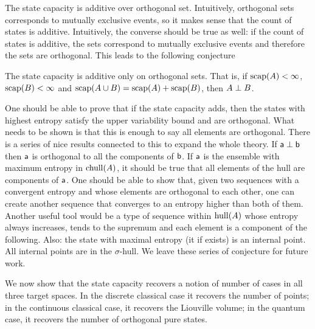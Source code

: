The state capacity is additive over orthogonal set. Intuitively, orthogonal sets corresponds to mutually exclusive events, so it makes sense that the count of states is additive. Intuitively, the converse should be true as well: if the count of states is additive, the sets correspond to mutually exclusive events and therefore the sets are orthogonal. This leads to the following conjecture

\begin{conj}
	The state capacity is additive only on orthogonal sets. That is, if $\scap(A)<\infty$, $\scap(B)<\infty$ and $\scap(A \cup B) = \scap(A) +\scap(B)$, then $A \ortho B$.
\end{conj}

One should be able to prove that if the state capacity adds, then the states with highest entropy satisfy the upper variability bound and are orthogonal. What needs to be shown is that this is enough to say all elements are orthogonal. There is a series of nice results connected to this to expand the whole theory. If $\ens[a] \ortho \ens[b]$ then $\ens[a]$ is orthogonal to all the components of $\ens[b]$. If $\ens[a]$ is the ensemble with maximum entropy in $\chull(A)$, it should be true that all elements of the hull are components of $\ens[a]$. One should be able to show that, given two sequences with a convergent entropy and whose elements are orthogonal to each other, one can create another sequence that converges to an entropy higher than both of them. Another useful tool would be a type of sequence within $\hull(A)$ whose entropy always increases, tends to the supremum and each element is a component of the following. Also: the state with maximal entropy (it if exists) is an internal point. All internal points are in the $\sigma$-hull. We leave these series of conjecture for future work.

We now show that the state capacity recovers a notion of number of cases in all three target spaces. In the discrete classical case it recovers the number of points; in the continuous classical case, it recovers the Liouville volume; in the quantum case, it recovers the number of orthogonal pure states.

